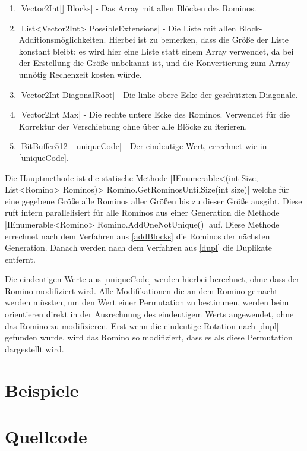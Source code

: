 \documentclass[a4paper,10pt,ngerman]{scrartcl}
\begin{document}
\begin{enumerate}
    \item |Vector2Int[] Blocks| - 
        Das Array mit allen Blöcken des Rominos.
    \item |List<Vector2Int> PossibleExtensions| - 
        Die Liste mit allen Block-Additionsmöglichkeiten.
        Hierbei ist zu bemerken, dass die Größe der Liste konstant bleibt; es wird hier eine Liste statt einem Array verwendet, da bei der Erstellung die Größe unbekannt ist, und die Konvertierung zum Array unnötig Rechenzeit kosten würde.
    \item |Vector2Int DiagonalRoot| - Die linke obere Ecke der 
        geschützten Diagonale.
    \item |Vector2Int Max| - Die rechte untere Ecke des Rominos.
        Verwendet für die Korrektur der Verschiebung ohne über alle Blöcke zu
        iterieren.
    \item |BitBuffer512 \_uniqueCode| - Der eindeutige Wert, errechnet
        wie in \cref{uniqueCode}.
\end{enumerate}

Die Hauptmethode ist die statische Methode
|IEnumerable<(int Size, List<Romino> Rominos)> Romino.GetRominosUntilSize(int size)|
welche für eine gegebene Größe alle Rominos aller Größen bis zu dieser
Größe ausgibt. Diese ruft intern parallelisiert für alle Rominos aus einer
Generation die Methode |IEnumerable<Romino> Romino.AddOneNotUnique()|
auf.
Diese Methode errechnet nach dem Verfahren aus \cref{addBlocks} die
Rominos der nächsten Generation.
Danach werden nach dem Verfahren aus \cref{dupl} die Duplikate entfernt.

Die eindeutigen Werte aus \cref{uniqueCode} werden hierbei berechnet, ohne
dass der Romino modifiziert wird. Alle Modifikationen die an dem Romino
gemacht werden müssten, um den Wert einer Permutation zu bestimmen, werden
beim orientieren direkt in der Ausrechnung des eindeutigem Werts angewendet, ohne das Romino zu
modifizieren. Erst wenn die eindeutige Rotation nach \cref{dupl} gefunden
wurde, wird das Romino so modifiziert, dass es als diese Permutation
dargestellt wird.

\section{Beispiele}

\section{Quellcode}
\end{document}
